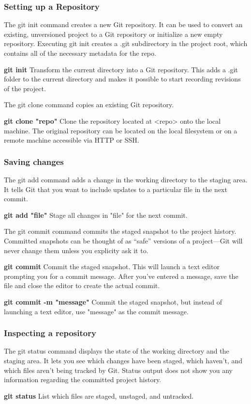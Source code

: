 \documentclass{beamer}
\begin{document}
\begin{frame}
\frametitle{Setting up a Repository}

	    The git init command creates a new Git repository. It can be used to convert an existing, unversioned project to a Git repository or initialize a new empty repository.  Executing git init creates a .git subdirectory in the project root, which contains all of the necessary metadata for the repo. 
		
		\textbf{git init}
	    Transform the current directory into a Git repository. This adds a .git folder to the current directory and makes it possible to start recording revisions of the project.
		
	
	    The git clone command copies an existing Git repository. 
	    
	    \textbf{git clone "repo"}
		Clone the repository located at <repo> onto the local machine. The original repository can be located on the local filesystem or on a remote machine accessible via HTTP or SSH.
\end{frame}

\begin{frame}
\frametitle{Saving changes}
	The git add command adds a change in the working directory to the staging area. It tells Git that you want to include updates to a particular file in the next commit.

		\textbf{git add "file"}
		Stage all changes in "file" for the next commit.
	
	
		The git commit command commits the staged snapshot to the project history. Committed snapshots can be thought of as “safe” versions of a project—Git will never change them unless you explicity ask it to. 

		\textbf{git commit}
		Commit the staged snapshot. This will launch a text editor prompting you for a commit message. After you’ve entered a message, save the file and close the editor to create the actual commit. 

		\textbf{git commit -m "message"}
		Commit the staged snapshot, but instead of launching a text editor, use "message" as the commit message.
\end{frame}



\begin{frame}
\frametitle{Inspecting a repository}

	    The git status command displays the state of the working directory and the staging area. It lets you see which changes have been staged, which haven’t, and which files aren’t being tracked by Git. Status output does not show you any information regarding the committed project history.

		\textbf{git status}
		List which files are staged, unstaged, and untracked.
\end{frame}
\end{document}
